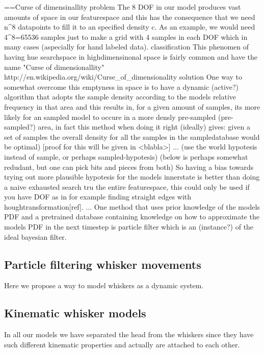 ==Curse of dimensinallity
{problem}
The 8 DOF in our model produces vast amounts of space in our featurespace and this has the consequence that we need \proportianal n^8 datapoints to fill it to an specified density c.
As an example, we would need 4^8=65536 samples just to make a grid with 4 samples in each DOF which in many cases (aspecially for hand labeled data). 
{classification}
This phenomen of having hue searchspace in highdimensinonal space is fairly common and have the name "Curse of dimensionallity" http://en.wikipedia.org/wiki/Curse_of_dimensionality
{solution}
One way to somewhat overcome this emptyness in space is to have a dynamic (active?) algorithm that adopts the sample density 
according to the models relative frequency in that area and this results in, for a given amount of samples, its more likely 
for an sampled model to occure in a more densly pre-sampled (pre-sampled?) area, in fact this method when doing it right (ideally) 
gives: given a set of samples the overall density for all the samples in the sampledatabase would be optimal) [proof for this will be given in <blabla>]
... (use the world hypotesis instead of sample, or perhaps sampled-hypotesis)
(below is perhaps somewhat redudant, but one can pick bits and pieces from both)
So having a bias towards trying out more plausible hypotesis for the models innerstate is better than 
doing a naive exhausted search tru the entire featurespace, this could only be used if you have  DOF as in for example finding straight edges with houghtransformation[ref].
...
One method that uses prior knowledge of the models PDF and a pretrained database containing knowledge on how to approximate the models PDF in the next timestep is particle filter which is an (instance?) of the ideal bayesian filter.






\subsection{Particle filtering whisker movements}
Here we propose a way to model whiskers as a dynamic system.

\subsection{Kinematic whisker models}

In all our models we have separated the head from the whiskers since they have
such different kinematic properties and actually are attached to each other.

